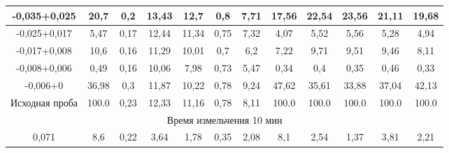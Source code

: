 {\begin{longtable}[c]{|p{}ccccccccccc|}
\multicolumn{1}{|c|}{-0,035+0,025} & \multicolumn{1}{c|}{20,7} & \multicolumn{1}{c|}{0,2} & \multicolumn{1}{c|}{13,43} & \multicolumn{1}{c|}{12,7} & \multicolumn{1}{c|}{0,8} & \multicolumn{1}{c|}{7,71} & \multicolumn{1}{c|}{17,56} & \multicolumn{1}{c|}{22,54} & \multicolumn{1}{c|}{23,56} & \multicolumn{1}{c|}{21,11} & 19,68 \\ \hline
\multicolumn{1}{|c|}{-0,025+0,017} & \multicolumn{1}{c|}{5,47} & \multicolumn{1}{c|}{0,17} & \multicolumn{1}{c|}{12,44} & \multicolumn{1}{c|}{11,34} & \multicolumn{1}{c|}{0,75} & \multicolumn{1}{c|}{7,32} & \multicolumn{1}{c|}{4,07} & \multicolumn{1}{c|}{5,52} & \multicolumn{1}{c|}{5,56} & \multicolumn{1}{c|}{5,28} & 4,94 \\ \hline
\multicolumn{1}{|c|}{-0,017+0,008} & \multicolumn{1}{c|}{10,6} & \multicolumn{1}{c|}{0,16} & \multicolumn{1}{c|}{11,29} & \multicolumn{1}{c|}{10,01} & \multicolumn{1}{c|}{0,7} & \multicolumn{1}{c|}{6,2} & \multicolumn{1}{c|}{7,22} & \multicolumn{1}{c|}{9,71} & \multicolumn{1}{c|}{9,51} & \multicolumn{1}{c|}{9,46} & 8,11 \\ \hline
\multicolumn{1}{|c|}{-0,008+0,006} & \multicolumn{1}{c|}{0,49} & \multicolumn{1}{c|}{0,16} & \multicolumn{1}{c|}{10,06} & \multicolumn{1}{c|}{7,98} & \multicolumn{1}{c|}{0,73} & \multicolumn{1}{c|}{5,47} & \multicolumn{1}{c|}{0,34} & \multicolumn{1}{c|}{0,4} & \multicolumn{1}{c|}{0,35} & \multicolumn{1}{c|}{0,46} & 0,33 \\ \hline
\multicolumn{1}{|c|}{-0,006+0} & \multicolumn{1}{c|}{36,98} & \multicolumn{1}{c|}{0,3} & \multicolumn{1}{c|}{11,87} & \multicolumn{1}{c|}{10,22} & \multicolumn{1}{c|}{0,78} & \multicolumn{1}{c|}{9,24} & \multicolumn{1}{c|}{47,62} & \multicolumn{1}{c|}{35,61} & \multicolumn{1}{c|}{33,88} & \multicolumn{1}{c|}{37,04} & 42,13 \\ \hline
\multicolumn{1}{|c|}{Исходная проба} & \multicolumn{1}{c|}{100.0} & \multicolumn{1}{c|}{0,23} & \multicolumn{1}{c|}{12,33} & \multicolumn{1}{c|}{11,16} & \multicolumn{1}{c|}{0,78} & \multicolumn{1}{c|}{8,11} & \multicolumn{1}{c|}{100.0} & \multicolumn{1}{c|}{100.0} & \multicolumn{1}{c|}{100.0} & \multicolumn{1}{c|}{100.0} & 100.0\\ \hline
\multicolumn{12}{|c|}{Время измельчения 10 мин} \\ \hline
\multicolumn{1}{|c|}{0,071} & \multicolumn{1}{c|}{8,6} & \multicolumn{1}{c|}{0,22} & \multicolumn{1}{c|}{3,64} & \multicolumn{1}{c|}{1,78} & \multicolumn{1}{c|}{0,35} & \multicolumn{1}{c|}{2,08} & \multicolumn{1}{c|}{8,1} & \multicolumn{1}{c|}{2,54} & \multicolumn{1}{c|}{1,37} & \multicolumn{1}{c|}{3,81} & 2,21 \\ \hline

\end{longtable}}
